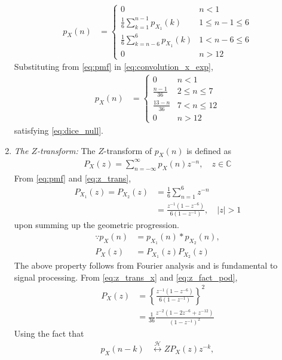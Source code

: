 \documentclass[journal,15pt,twocolumn]{IEEEtran}
\providecommand{\brak}[1]{\ensuremath{\left(#1\right)}}
\providecommand{\cbrak}[1]{\ensuremath{\left\{#1\right\}}}
\providecommand{\abs}[1]{\left\vert#1\right\vert}
\providecommand{\system}{\overset{\mathcal{H}}{ \longleftrightarrow}}
\begin{document}
\begin{enumerate}
\begin{align}
p_X(n) &= 
\begin{cases}
0 & n < 1
\\
\frac{1}{6}\sum_{k=1}^{n-1}p_{X_1}(k) &  1 \le n-1 \le  6
\\
\frac{1}{6}\sum_{k=n-6}^{6}p_{X_1}(k) & 1 < n-6 \le 6
\\
0 & n > 12
\end{cases}
\label{eq:convolution_x_exp}
\end{align}
Substituting from \eqref{eq:pmf} in \eqref{eq:convolution_x_exp},
\begin{align}
p_X(n) &= 
\begin{cases}
0 & n < 1
\\
\frac{n-1}{36} &  2 \le n \le  7
\\
\frac{13-n}{36} & 7 < n \le 12
\\
0 & n > 12
\end{cases}
\label{eq:convolution_x_final}
\end{align}
satisfying \eqref{eq:dice_null}.
\item {\em The $Z$-transform: }
The $Z$-transform of $p_X(n)$ is defined as 
\begin{align}
P_X(z) = \sum_{n = -\infty}^{\infty}p_X(n)z^{-n}, \quad z \in \mathbb{C}
\label{eq:z_trans}
\end{align}
%
From \eqref{eq:pmf} and \eqref{eq:z_trans}, 
\begin{align}
P_{X_1}(z) =P_{X_2}(z) &= \frac{1}{6}\sum_{n = 1}^{6}z^{-n}
\\
&=\frac{z^{-1}\brak{1-z^{-6}}}{6\brak{1-z^{-1}}}, \quad \abs{z} > 1
\label{eq:z_trans_x}
\end{align}
upon summing up the geometric progression.  
\begin{align}
\because p_X(n) &= p_{X_1}(n)*p_{X_2}(n),
\\
P_X(z) &= P_{X_1}(z)P_{X_2}(z)
\label{eq:z_fact_pod}
\end{align}
The above property follows from Fourier analysis and is fundamental to signal processing. 
From \eqref{eq:z_trans_x} and \eqref{eq:z_fact_pod},
\begin{align}
P_X(z) &= \cbrak{\frac{z^{-1}\brak{1-z^{-6}}}{6\brak{1-z^{-1}}}}^2
\\
&= \frac{1}{36}\frac{z^{-2}\brak{1-2z^{-6}+z^{-12}}}{\brak{1-z^{-1}}^2}
\label{eq:z_fact}
\end{align}
Using the fact that 
\begin{align}
p_X(n-k) &\system{Z}P_X(z)z^{-k},
\\

\end{align}
\end{enumerate}
\end{document}
